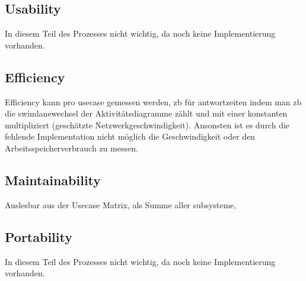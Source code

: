 \subsection{Usability}
In diesem Teil des Prozesses nicht wichtig, da noch keine Implementierung vorhanden.

\subsection{Efficiency}
Efficiency kann pro usecase gemessen werden, zb für antwortzeiten indem man zb die swimlanewechsel der Aktivitätsdiagramme zählt und mit einer konstanten multipliziert (geschätzte Netzwerkgeschwindigkeit). Ansonsten ist es durch die fehlende Implementation nicht möglich die Geschwindigkeit oder den Arbeitsspeicherverbrauch zu messen.

\subsection{Maintainability}
Auslesbar aus der Usecase Matrix, als Summe aller subsysteme,

\subsection{Portability}
In diesem Teil des Prozesses nicht wichtig, da noch keine Implementierung vorhanden.
